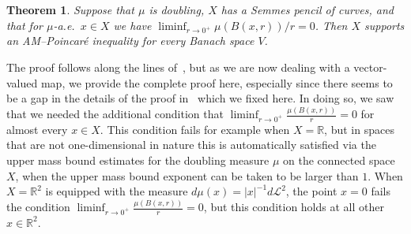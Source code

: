 \documentclass[11pt, letterpaper]{amsart} %
\newcommand*{\R}{{\mathbb R}}
\numberwithin{equation}{section}
\theoremstyle{plain}
\newtheorem{theorem}[equation]{Theorem}
\theoremstyle{definition}
\begin{document}
{\begin{theorem}\label{thm:semmesBVAM}
Suppose that $\mu$ is doubling, $X$ has a Semmes pencil of curves, and that for $\mu$-a.e.~$x\in X$
we have $\liminf_{r\to 0^+}\mu(B(x,r))/r=0$.
Then $X$ supports an AM--Poincar\'e inequality 
for every Banach space $V$.
\end{theorem}

The proof follows along the lines of~\cite[Proposition~3.9]{DEKS}, but as we are now dealing with a vector-valued map,
we provide the complete proof here, especially since there seems to be a gap in the details of the proof in~\cite{DEKS} 
which we fixed here. In doing so, we saw that we needed the additional condition that $\liminf_{r\to 0^+}\tfrac{\mu(B(x,r))}{r}=0$
for almost every $x\in X$. This condition fails for example when $X=\R$, but in spaces that are not one-dimensional in nature
this is automatically satisfied via the upper mass bound estimates for the doubling measure $\mu$ on the connected space $X$,
when the upper mass bound exponent can be taken to be larger than $1$. When $X=\R^2$ is equipped with the
measure $d\mu(x)=|x|^{-1}d\mathcal{L}^2$, the point $x=0$ fails the condition $\liminf_{r\to 0^+}\tfrac{\mu(B(x,r))}{r}=0$, but
this condition holds at all other $x\in \R^2$.

}
\end{document}
